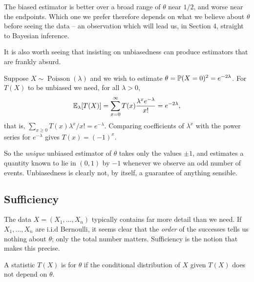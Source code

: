 \documentclass[a4paper]{scrartcl}
\newcommand{\mse}{\operatorname{mse}}
\newcommand{\Poisson}{\operatorname{Poisson}}
\begin{document}
\begin{example}
\begin{center}
  \end{center}

  The biased estimator is better over a broad range of $\theta$ near $1/2$, and worse near the endpoints. Which one we prefer therefore depends on what we believe about $\theta$ before seeing the data -- an observation which will lead us, in Section 4, straight to Bayesian inference.
\end{example}

It is also worth seeing that insisting on unbiasedness can produce estimators that are frankly absurd.

\begin{example}
  Suppose $X \sim \Poisson(\lambda)$ and we wish to estimate $\theta = \mathbb{P}(X = 0)^2 = e^{-2\lambda}$. For $T(X)$ to be unbiased we need, for all $\lambda > 0$,
  $$
  \mathbb{E}_\lambda[T(X)] = \sum_{x = 0}^{\infty} T(x)\frac{\lambda^x e^{-\lambda}}{x!} = e^{-2\lambda},
  $$
  that is, $\sum_{x \geq 0}T(x)\lambda^x/x! = e^{-\lambda}$. Comparing coefficients of $\lambda^x$ with the power series for $e^{-\lambda}$ gives $T(x) = (-1)^x$.

  So the \emph{unique} unbiased estimator of $\theta$ takes only the values $\pm 1$, and estimates a quantity known to lie in $(0,1)$ by $-1$ whenever we observe an odd number of events. Unbiasedness is clearly not, by itself, a guarantee of anything sensible.
\end{example}

\subsection{Sufficiency}

The data $X = (X_1, \dots, X_n)$ typically contains far more detail than we need. If $X_1, \dots, X_n$ are i.i.d Bernoulli, it seems clear that the \emph{order} of the successes tells us nothing about $\theta$; only the total number matters. Sufficiency is the notion that makes this precise.

\begin{definition}
  A statistic $T(X)$ is  for $\theta$ if the conditional distribution of $X$ given $T(X)$ does not depend on $\theta$.
\end{definition}
\end{document}
